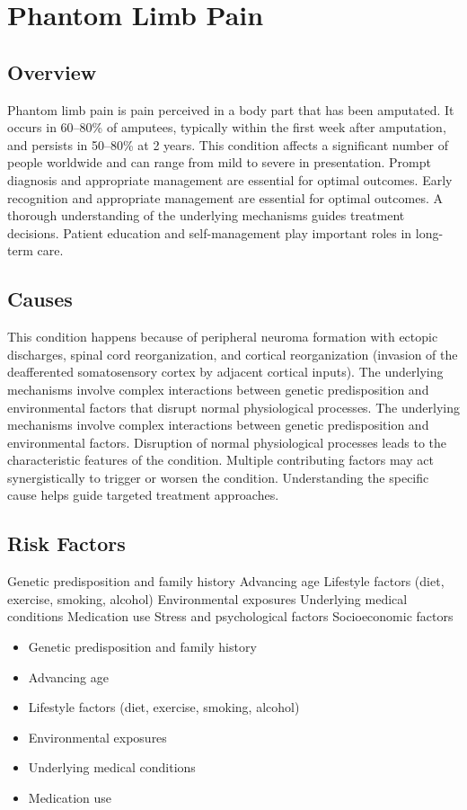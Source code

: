 \chapter{Phantom Limb Pain}
\label{sec:Phantom Limb Pain}

\section{Overview}
Phantom limb pain is pain perceived in a body part that has been amputated. It occurs in 60--80\% of amputees, typically within the first week after amputation, and persists in 50--80\% at 2 years. This condition affects a significant number of people worldwide and can range from mild to severe in presentation. Prompt diagnosis and appropriate management are essential for optimal outcomes. Early recognition and appropriate management are essential for optimal outcomes. A thorough understanding of the underlying mechanisms guides treatment decisions. Patient education and self-management play important roles in long-term care.
\section{Causes}
This condition happens because of peripheral neuroma formation with ectopic discharges, spinal cord reorganization, and cortical reorganization (invasion of the deafferented somatosensory cortex by adjacent cortical inputs). The underlying mechanisms involve complex interactions between genetic predisposition and environmental factors that disrupt normal physiological processes. The underlying mechanisms involve complex interactions between genetic predisposition and environmental factors. Disruption of normal physiological processes leads to the characteristic features of the condition. Multiple contributing factors may act synergistically to trigger or worsen the condition. Understanding the specific cause helps guide targeted treatment approaches.
\section{Risk Factors}
Genetic predisposition and family history Advancing age Lifestyle factors (diet, exercise, smoking, alcohol) Environmental exposures Underlying medical conditions Medication use Stress and psychological factors Socioeconomic factors

\begin{itemize}[noitemsep]
  \item Genetic predisposition and family history
  \item Advancing age
  \item Lifestyle factors (diet, exercise, smoking, alcohol)
  \item Environmental exposures
  \item Underlying medical conditions
  \item Medication use
\end{itemize}
